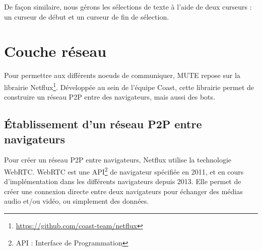 \documentclass[12pt]{thesul}
\begin{document}
De façon similaire, nous gérons les sélections de texte à l'aide de deux curseurs : un curseur de début et un curseur de fin de sélection.






\section{Couche réseau}

Pour permettre aux différents noeuds de communiquer, MUTE repose sur la librairie Netflux\footnote{\url{https://github.com/coast-team/netflux}}.
Développée au sein de l'équipe Coast, cette librairie permet de construire un réseau \ac{P2P} entre des navigateurs, mais aussi des bots.

\subsection{Établissement d'un réseau \ac{P2P} entre navigateurs}

Pour créer un réseau \ac{P2P} entre navigateurs, Netflux utilise la technologie \acf{WebRTC}.
\ac{WebRTC} est une API\footnote{\ac{API} : Interface de Programmation} de navigateur spécifiée en 2011, et en cours d'implémentation dans les différents navigateurs depuis 2013.
Elle permet de créer une connexion directe entre deux navigateurs pour échanger des médias audio et/ou vidéo, ou simplement des données.
\end{document}
